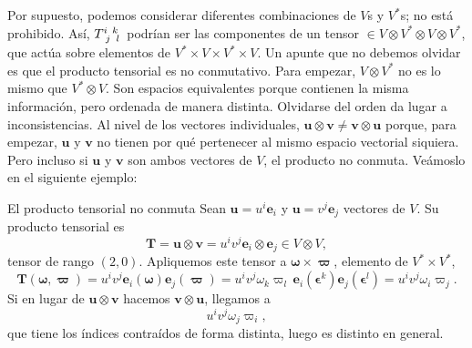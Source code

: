 Por supuesto, podemos considerar diferentes combinaciones de \(V\)s y \(V^*\)s; no está prohibido. Así, \(\tensor{T}{^i_j^k_l}\) podrían ser las componentes de un tensor \(\in V\otimes V^*\otimes V\otimes V^*\), que actúa sobre elementos de \(V^*\times V\times V^*\times V\). Un apunte que no debemos olvidar es que el producto tensorial es no conmutativo. Para empezar, \(V\otimes V^*\) no es lo mismo que \(V^* \otimes V\). Son espacios equivalentes porque contienen la misma información, pero ordenada de manera distinta. Olvidarse del orden da lugar a inconsistencias. Al nivel de los vectores individuales, \(\mathbf{u}\otimes\mathbf{v}\neq \mathbf{v}\otimes\mathbf{u}\) porque, para empezar, \(\mathbf{u}\) y \(\mathbf{v}\) no tienen por qué pertenecer al mismo espacio vectorial siquiera. Pero incluso si \(\mathbf{u}\) y \(\mathbf{v}\) son ambos vectores de \(V\), el producto no conmuta. Veámoslo en el siguiente ejemplo:

\begin{example}
    {El producto tensorial no conmuta
    \label{ex.2productotensorial_conmutacion}}
    Sean \(\mathbf{u} = u^i\mathbf{e}_{i}\) y \(\mathbf{u} = v^j\mathbf{e}_{j}\) vectores de \(V\). Su producto tensorial es 
    \begin{equation*}
        \mathbf{T} = \mathbf{u}\otimes\mathbf{v} = u^iv^j\mathbf{e}_i\otimes\mathbf{e}_j \in V\otimes V,
    \end{equation*}
    tensor de rango \((2, 0)\). Apliquemos este tensor a \(\boldsymbol{\omega}\times\boldsymbol{\varpi}\), elemento de \(V^*\times V^*\), 
    \begin{equation*}
        \mathbf{T}(\boldsymbol{\omega},\boldsymbol{\varpi}) = u^iv^j\mathbf{e}_i(\boldsymbol{\omega})\mathbf{e}_j(\boldsymbol{\varpi}) =  u^iv^j\omega_k \varpi_l\, \mathbf{e}_i(\boldsymbol{\epsilon}^k)\mathbf{e}_j(\boldsymbol{\epsilon}^l) = u^i v^j\omega_i\varpi_j.
    \end{equation*}
    Si en lugar de \(\mathbf{u}\otimes\mathbf{v}\) hacemos \(\mathbf{v}\otimes\mathbf{u}\), llegamos a 
    \begin{equation*}
        u^iv^j\omega_j\varpi_i,
    \end{equation*}
    que tiene los índices contraídos de forma distinta, luego es distinto en general.
\end{example}

